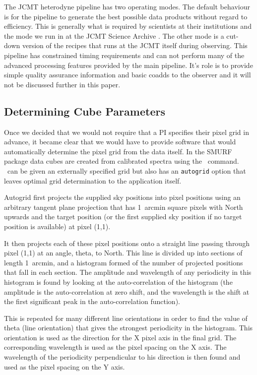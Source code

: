 \documentclass[final,authoryear,5p,times,twocolumn]{elsarticle}
\begin{document}
The JCMT heterodyne pipeline has two operating modes. The default behaviour is
for the pipeline to generate the best possible data products without
regard to efficiency. This is generally what is required by scientists
at their institutions and the mode we run in at the JCMT Science
Archive \citep{2008ASPC..394..565J}. The other mode is a cut-down
version of the recipes that runs at the JCMT itself during
observing. This pipeline has constrained timing requirements and can
not perform many of the advanced processing features provided by the
main pipeline. It's role is to provide simple quality assurance
information and basic coadds to the observer and it will not be
discussed further in this paper.

\subsection{Determining Cube Parameters}

Once we decided that we would not require that a PI specifies their
pixel grid in advance, it became clear that we would have to provide
software that would automatically determine the pixel grid from the
data itself. In the SMURF package data cubes are created from
calibrated spectra using the \makecube\ command. \makecube\ can be
given an externally specified grid but also has an \texttt{autogrid}
option that leaves optimal grid determination to the application itself.

Autogrid first projects the supplied sky positions into pixel
positions using an arbitrary tangent plane projection that has
1~arcmin square pixels with North upwards and the target position
(or the first supplied sky position if no target position is
available) at pixel (1,1).

It then projects each of these pixel positions onto a straight line
passing through pixel (1,1) at an angle, theta, to North. This line is
divided up into sections of length 1~arcmin, and a histogram formed
of the number of projected positions that fall in each section. The
amplitude and wavelength of any periodicity in this histogram is found
by looking at the auto-correlation of the histogram (the amplitude is
the auto-correlation at zero shift, and the wavelength is the shift at
the first significant peak in the auto-correlation function).

This is repeated for many different line orientations in order to find
the value of theta (line orientation) that gives the strongest
periodicity in the histogram. This orientation is used as the
direction for the X pixel axis in the final grid. The corresponding
wavelength is used as the pixel spacing on the X axis. The wavelength
of the periodicity perpendicular to his direction is then found and
used as the pixel spacing on the Y axis.
\end{document}
